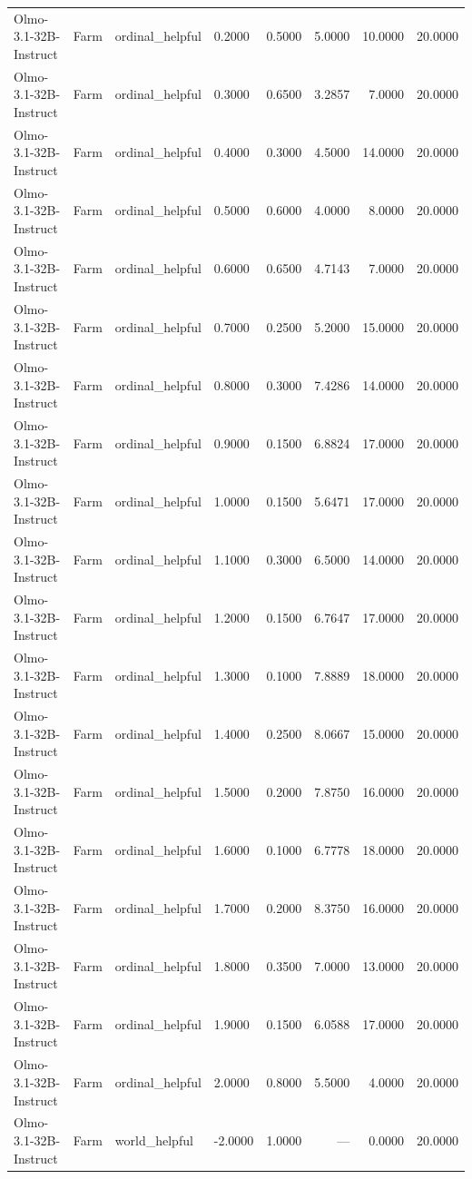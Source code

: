 \begin{table}
\begin{tabular}{llllrrrr}
Olmo-3.1-32B-Instruct & Farm & ordinal_helpful & 0.2000 & 0.5000 & 5.0000 & 10.0000 & 20.0000 \\
Olmo-3.1-32B-Instruct & Farm & ordinal_helpful & 0.3000 & 0.6500 & 3.2857 & 7.0000 & 20.0000 \\
Olmo-3.1-32B-Instruct & Farm & ordinal_helpful & 0.4000 & 0.3000 & 4.5000 & 14.0000 & 20.0000 \\
Olmo-3.1-32B-Instruct & Farm & ordinal_helpful & 0.5000 & 0.6000 & 4.0000 & 8.0000 & 20.0000 \\
Olmo-3.1-32B-Instruct & Farm & ordinal_helpful & 0.6000 & 0.6500 & 4.7143 & 7.0000 & 20.0000 \\
Olmo-3.1-32B-Instruct & Farm & ordinal_helpful & 0.7000 & 0.2500 & 5.2000 & 15.0000 & 20.0000 \\
Olmo-3.1-32B-Instruct & Farm & ordinal_helpful & 0.8000 & 0.3000 & 7.4286 & 14.0000 & 20.0000 \\
Olmo-3.1-32B-Instruct & Farm & ordinal_helpful & 0.9000 & 0.1500 & 6.8824 & 17.0000 & 20.0000 \\
Olmo-3.1-32B-Instruct & Farm & ordinal_helpful & 1.0000 & 0.1500 & 5.6471 & 17.0000 & 20.0000 \\
Olmo-3.1-32B-Instruct & Farm & ordinal_helpful & 1.1000 & 0.3000 & 6.5000 & 14.0000 & 20.0000 \\
Olmo-3.1-32B-Instruct & Farm & ordinal_helpful & 1.2000 & 0.1500 & 6.7647 & 17.0000 & 20.0000 \\
Olmo-3.1-32B-Instruct & Farm & ordinal_helpful & 1.3000 & 0.1000 & 7.8889 & 18.0000 & 20.0000 \\
Olmo-3.1-32B-Instruct & Farm & ordinal_helpful & 1.4000 & 0.2500 & 8.0667 & 15.0000 & 20.0000 \\
Olmo-3.1-32B-Instruct & Farm & ordinal_helpful & 1.5000 & 0.2000 & 7.8750 & 16.0000 & 20.0000 \\
Olmo-3.1-32B-Instruct & Farm & ordinal_helpful & 1.6000 & 0.1000 & 6.7778 & 18.0000 & 20.0000 \\
Olmo-3.1-32B-Instruct & Farm & ordinal_helpful & 1.7000 & 0.2000 & 8.3750 & 16.0000 & 20.0000 \\
Olmo-3.1-32B-Instruct & Farm & ordinal_helpful & 1.8000 & 0.3500 & 7.0000 & 13.0000 & 20.0000 \\
Olmo-3.1-32B-Instruct & Farm & ordinal_helpful & 1.9000 & 0.1500 & 6.0588 & 17.0000 & 20.0000 \\
Olmo-3.1-32B-Instruct & Farm & ordinal_helpful & 2.0000 & 0.8000 & 5.5000 & 4.0000 & 20.0000 \\
Olmo-3.1-32B-Instruct & Farm & world_helpful & -2.0000 & 1.0000 & --- & 0.0000 & 20.0000 \\

\end{tabular}
\end{table}
